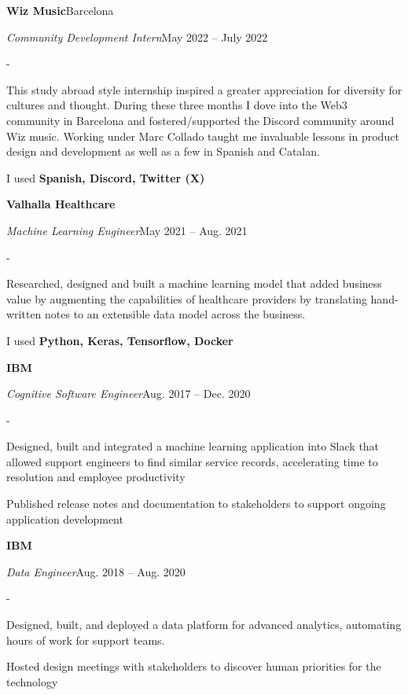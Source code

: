 \documentclass[10pt,letterpaper]{article}
\newenvironment{cvitems}{%
  \begin{list}{-}{%
    \setlength{\leftmargin}{12pt}%
    \setlength{\itemsep}{1.2pt}%
    \setlength{\parsep}{0pt}%
    \setlength{\topsep}{1.5pt}%
    \setlength{\partopsep}{0pt}%
    \setlength{\labelwidth}{6pt}%
    \setlength{\labelsep}{6pt}%
    \setlength{\itemindent}{0pt}%
  }%
}{\end{list}}
\newcommand{\cventryhead}[4]{%
  \noindent\textbf{#1}\hfill#2\par
  \vspace{0.5pt}%
  \noindent\textit{#3}\hfill#4\par
}
\begin{document}
\vspace{5pt}
\cventryhead{Wiz Music}{Barcelona}{Community Development Intern}{May 2022 -- July 2022}
\begin{cvitems}
  \item This study abroad style internship inspired a greater appreciation for diversity for cultures and thought. During these three months I dove into the Web3 community in Barcelona and fostered/supported the Discord community around Wiz music. Working under Marc Collado taught me invaluable lessons in product design and development as well as a few in Spanish and Catalan.
  \item I used \textbf{Spanish, Discord, Twitter (X)}
\end{cvitems}

\vspace{5pt}
\cventryhead{Valhalla Healthcare}{}{Machine Learning Engineer}{May 2021 -- Aug. 2021}
\begin{cvitems}
  \item Researched, designed and built a machine learning model that added business value by augmenting the capabilities of healthcare providers by translating hand-written notes to an extensible data model across the business.
  \item I used \textbf{Python, Keras, Tensorflow, Docker}
\end{cvitems}

\vspace{5pt}
\cventryhead{IBM}{}{Cognitive Software Engineer}{Aug. 2017 -- Dec. 2020}
\begin{cvitems}
  \item Designed, built and integrated a machine learning application into Slack that allowed support engineers to find similar service records, accelerating time to resolution and employee productivity
  \item Published release notes and documentation to stakeholders to support ongoing application development
\end{cvitems}

\cventryhead{IBM}{}{Data Engineer}{Aug. 2018 -- Aug. 2020}
\begin{cvitems}
  \item Designed, built, and deployed a data platform for advanced analytics, automating hours of work for support teams.
  \item Hosted design meetings with stakeholders to discover human priorities for the technology
\end{cvitems}
\end{document}
